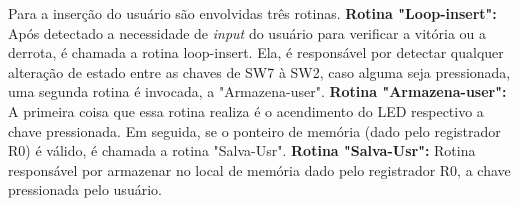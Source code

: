 \documentclass{article}
\begin{document}
Para a inserção do usuário são envolvidas três rotinas.\newline
\textbf{Rotina "Loop-insert":} Após detectado a necessidade de \textit{input} do usuário para verificar a vitória ou a derrota, é chamada a rotina loop-insert. Ela, é responsável por detectar qualquer alteração de estado entre as chaves de SW7 à SW2, caso alguma seja pressionada, uma segunda rotina é invocada, a "Armazena-user".\newline
\textbf{Rotina "Armazena-user":} A primeira coisa que essa rotina realiza é o acendimento do LED respectivo a chave pressionada. Em seguida, se o ponteiro de memória (dado pelo registrador R0) é válido, é chamada a rotina "Salva-Usr".
\textbf{Rotina "Salva-Usr":} Rotina responsável por armazenar no local de memória dado pelo registrador R0, a chave pressionada pelo usuário.
\end{document}
